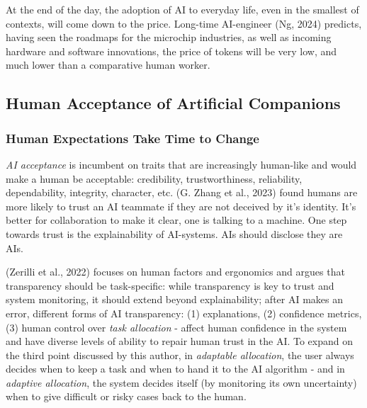 \documentclass[
  12pt,
  letterpaper,
  DIV=11,
  numbers=noendperiod]{scrartcl}
\begin{document}
At the end of the day, the adoption of AI to everyday life, even in the
smallest of contexts, will come down to the price. Long-time AI-engineer
(Ng, 2024) predicts, having seen the roadmaps for the microchip
industries, as well as incoming hardware and software innovations, the
price of tokens will be very low, and much lower than a comparative
human worker.

\subsection{Human Acceptance of Artificial
Companions}\label{human-acceptance-of-artificial-companions}

\subsubsection{Human Expectations Take Time to
Change}\label{human-expectations-take-time-to-change}

\emph{AI acceptance} is incumbent on traits that are increasingly
human-like and would make a human be acceptable: credibility,
trustworthiness, reliability, dependability, integrity, character, etc.
(G. Zhang et al., 2023) found humans are more likely to trust an AI
teammate if they are not deceived by it's identity. It's better for
collaboration to make it clear, one is talking to a machine. One step
towards trust is the explainability of AI-systems. AIs should disclose
they are AIs.

(Zerilli et al., 2022) focuses on human factors and ergonomics and
argues that transparency should be task-specific: while transparency is
key to trust and system monitoring, it should extend beyond
explainability; after AI makes an error, different forms of AI
transparency: (1) explanations, (2) confidence metrics, (3) human
control over \emph{task allocation} - affect human confidence in the
system and have diverse levels of ability to repair human trust in the
AI. To expand on the third point discussed by this author, in
\emph{adaptable allocation}, the user always decides when to keep a task
and when to hand it to the AI algorithm - and in \emph{adaptive
allocation}, the system decides itself (by monitoring its own
uncertainty) when to give difficult or risky cases back to the human.
\end{document}
